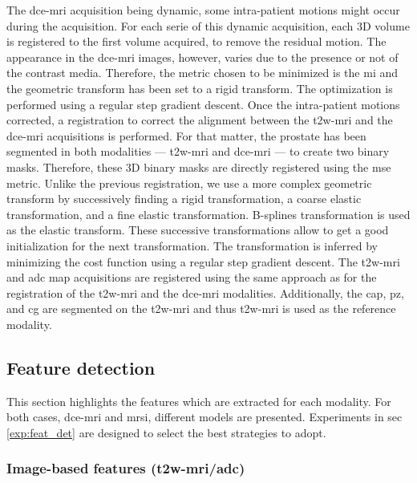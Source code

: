 \documentclass[a4paper,num-refs]{wiley-article}
\begin{document}
The \ac{dce}-\ac{mri} acquisition being dynamic, some intra-patient motions
might occur during the acquisition. For each serie of this dynamic
acquisition, each 3D volume is registered to the first volume acquired, to
remove the residual motion. The appearance in the \ac{dce}-\ac{mri} images,
however, varies due to the presence or not of the contrast media. Therefore,
the metric chosen to be minimized is the \ac{mi} and the geometric transform
has been set to a rigid transform. The optimization is performed using a
regular step gradient descent.
Once the intra-patient motions corrected, a registration to correct the
alignment between the \ac{t2w}-\ac{mri} and the \ac{dce}-\ac{mri} acquisitions
is performed. For that matter, the prostate has been segmented in both
modalities --- \ac{t2w}-\ac{mri} and \ac{dce}-\ac{mri} --- to create two binary
masks. Therefore, these 3D binary masks are directly registered using the
\ac{mse} metric. Unlike the previous registration, we use a more complex
geometric transform by successively finding a rigid transformation, a coarse
elastic transformation, and a fine elastic transformation. B-splines
transformation is used as the elastic transform. These successive
transformations allow to get a good initialization for the next transformation.
The transformation is inferred by minimizing the cost function using a regular
step gradient descent.
The \ac{t2w}-\ac{mri} and \ac{adc} map acquisitions are registered using the
same approach as for the registration of the \ac{t2w}-\ac{mri} and the
\ac{dce}-\ac{mri} modalities.
Additionally, the \ac{cap}, \ac{pz}, and \ac{cg} are segmented on the
\ac{t2w}-\ac{mri} and thus \ac{t2w}-\ac{mri} is used as the reference modality.

\subsection{Feature detection}

This section highlights the features which are extracted for each modality. For
both cases, \ac{dce}-\ac{mri} and \ac{mrsi}, different models are
presented. Experiments in \acs{sec}\,\ref{exp:feat_det} are designed to select
the best strategies to adopt.

\subsubsection{Image-based features (\acs*{t2w}-\ac{mri}/\acs*{adc})}
\end{document}
